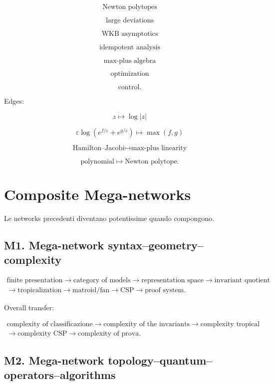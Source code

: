 \documentclass[11pt]{article}
\begin{document}
\[
\text{Newton polytopes}
\]

\[
\text{large deviations}
\]

\[
\text{WKB asymptotics}
\]

\[
\text{idempotent analysis}
\]

\[
\text{max-plus algebra}
\]

\[
\text{optimization}
\]

\[
\text{control}.
\]

Edges:

\[
z\mapsto \log|z|
\]

\[
\varepsilon\log(e^{f/\varepsilon}+e^{g/\varepsilon})\mapsto \max(f,g)
\]

\[
\text{Hamilton--Jacobi}\mapsto \text{max-plus linearity}
\]

\[
\text{polynomial}\mapsto \text{Newton polytope}.
\]



\section{Composite Mega-networks}

Le networks precedenti diventano potentissime quando compongono.



\subsection{M1. Mega-network syntax--geometry--complexity}

\[
\begin{gathered}
\text{finite presentation} \to \text{category of models} \to \text{representation space} \to \text{invariant quotient} \\
\to \text{tropicalization} \to \text{matroid/fan} \to \text{CSP} \to \text{proof system}.
\end{gathered}
\]

Overall transfer:

\[
\begin{gathered}
\text{complexity of classificazione} \to \text{complexity of the invariants} \to \text{complexity tropical} \\
\to \text{complexity CSP} \to \text{complexity of prova}.
\end{gathered}
\]



\subsection{M2. Mega-network topology--quantum--operators--algorithms}
\end{document}
